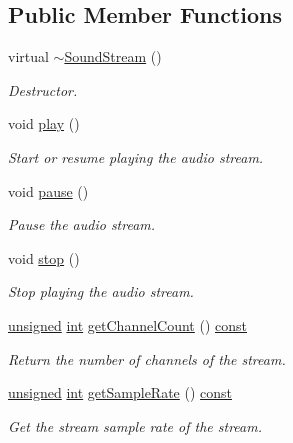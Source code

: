 \subsection*{Public Member Functions}
\begin{DoxyCompactItemize}
\item 
virtual \hyperlink{classsf_1_1_sound_stream_a1fafb9f1ca572d23d7d6a17921860d85}{$\sim$\-Sound\-Stream} ()
\begin{DoxyCompactList}\small\item\em Destructor. \end{DoxyCompactList}\item 
void \hyperlink{classsf_1_1_sound_stream_afdc08b69cab5f243d9324940a85a1144}{play} ()
\begin{DoxyCompactList}\small\item\em Start or resume playing the audio stream. \end{DoxyCompactList}\item 
void \hyperlink{classsf_1_1_sound_stream_a932ff181e661503cad288b4bb6fe45ca}{pause} ()
\begin{DoxyCompactList}\small\item\em Pause the audio stream. \end{DoxyCompactList}\item 
void \hyperlink{classsf_1_1_sound_stream_a16cc6a0404b32e42c4dce184bb94d0f4}{stop} ()
\begin{DoxyCompactList}\small\item\em Stop playing the audio stream. \end{DoxyCompactList}\item 
\hyperlink{curses_8priv_8h_aca40206900cfc164654362fa8d4ad1e6}{unsigned} \hyperlink{term__entry_8h_ad65b480f8c8270356b45a9890f6499ae}{int} \hyperlink{classsf_1_1_sound_stream_a68dedd0a2c26e6937c80fab3d235edea}{get\-Channel\-Count} () \hyperlink{term__entry_8h_a57bd63ce7f9a353488880e3de6692d5a}{const} 
\begin{DoxyCompactList}\small\item\em Return the number of channels of the stream. \end{DoxyCompactList}\item 
\hyperlink{curses_8priv_8h_aca40206900cfc164654362fa8d4ad1e6}{unsigned} \hyperlink{term__entry_8h_ad65b480f8c8270356b45a9890f6499ae}{int} \hyperlink{classsf_1_1_sound_stream_aad1da51c7a752682ca208bf11e3349bb}{get\-Sample\-Rate} () \hyperlink{term__entry_8h_a57bd63ce7f9a353488880e3de6692d5a}{const} 
\begin{DoxyCompactList}\small\item\em Get the stream sample rate of the stream. \end{DoxyCompactList}\item 

\end{DoxyCompactItemize}
